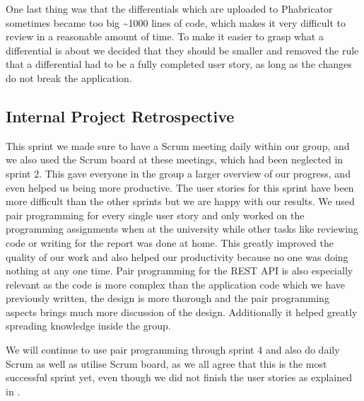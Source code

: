 One last thing was that the differentials which are uploaded to Phabricator sometimes became too big \textasciitilde 1000 lines of code, which makes it very difficult to review in a reasonable amount of time.
To make it easier to grasp what a differential is about we decided that they should be smaller and removed the rule that a differential had to be a fully completed user story, as long as the changes do not break the application.

\subsection*{Internal Project Retrospective}
This sprint we made sure to have a Scrum meeting daily within our group, and we also used the Scrum board at these meetings, which had been neglected in sprint 2.
This gave everyone in the group a larger overview of our progress, and even helped us being more productive. 
The user stories for this sprint have been more difficult than the other sprints but we are happy with our results.
We used pair programming for every single user story and only worked on the programming assignments when at the university while other tasks like reviewing code or writing for the report was done at home.
This greatly improved the quality of our work and also helped our productivity because no one was doing nothing at any one time.
Pair programming for the REST API is also especially relevant as the code is more complex than the application code which we have previously written, the design is more thorough and the pair programming aspects brings much more discussion of the design.
Additionally it helped greatly spreading knowledge inside the group.

We will continue to use pair programming through sprint 4 and also do daily Scrum as well as utilise Scrum board, as we all agree that this is the most successful sprint yet, even though we did not finish the user stories as explained in .
